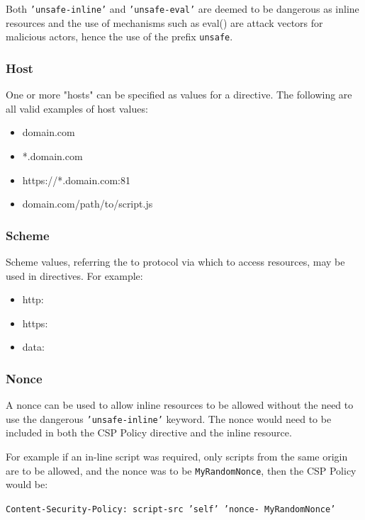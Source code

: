 \documentclass{mscreport}
\begin{document}
Both \texttt{'unsafe-inline'} and \texttt{'unsafe-eval'} are deemed to be dangerous as inline resources and the use of mechanisms such as eval() are attack vectors for malicious actors, hence the use of the prefix \texttt{unsafe}.

\subsubsection{Host}
One or more "hosts" can be specified as values for a directive. The following are all valid examples of host values:
\begin{itemize}
	\setlength\itemsep{0.1em}
	\item domain.com
	\item *.domain.com
	\item https://*.domain.com:81
	\item domain.com/path/to/script.js
\end{itemize}

\subsubsection{Scheme}
Scheme values, referring the to protocol via which to access resources, may be used in directives. For example:

\begin{itemize}
	\setlength\itemsep{0.1em}
	\item http:
	\item https:
	\item data:
\end{itemize}


\subsubsection{Nonce}
A nonce can be used to allow inline resources to be allowed without the need to use the dangerous \texttt{'unsafe-inline'} keyword. The nonce would need to be included in both the CSP Policy directive and the inline resource.

\vspace{0.3cm}
\noindent
For example if an in-line script was required, only scripts from the same origin are to be allowed, and the nonce was to be \texttt{MyRandomNonce}, then the CSP Policy would be:

\vspace{0.3cm}
\noindent
\texttt{Content-Security-Policy: script-src 'self' 'nonce- MyRandomNonce'}
\end{document}
